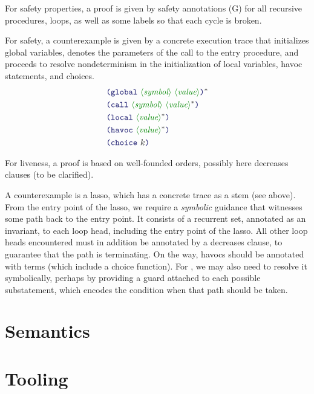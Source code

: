 \documentclass[runningheads]{llncs}
\begin{document}
For safety properties, a proof is given by safety annotations (G)
for all recursive procedures, loops, as well as some labels so that each cycle is broken.

For safety, a counterexample is given by a concrete execution trace
that initializes global variables, denotes the parameters
of the call to the entry procedure,
and proceeds to resolve nondeterminism in the initialization of local variables,
havoc statements, and choices.
\begin{align*}
& \LP \terminal{global}~ \nonterminal{symbol}~\nonterminal{value} \RP\rstar \\
& \LP \terminal{call}~   \nonterminal{symbol}~\nonterminal{value}\rstar \RP \\
& \LP \terminal{local}~ \nonterminal{value}\rstar \RP \\
& \LP \terminal{havoc}~ \nonterminal{value}\rstar \RP \\
& \LP \terminal{choice}~  k \RP \\
\end{align*}

For liveness, a proof is based on well-founded orders,
possibly here decreases clauses (to be clarified).

A counterexample is a lasso,
which has a concrete trace as a stem (see above).
From the entry point of the lasso,
we require a \emph{symbolic} guidance that witnesses some path
back to the entry point.
It consists of a recurrent set, annotated as an invariant,
to each loop head, including the entry point of the lasso.
All other loop heads encountered must in addition be annotated
by a decreases clause, to guarantee that the path is terminating.
On the way, havocs should be annotated with terms
(which include a choice function).
For , we may also need to resolve it symbolically,
perhaps by providing a guard attached to each possible substatement,
which encodes the condition when that path should be taken.

\section{Semantics}

\section{Tooling}
\end{document}

